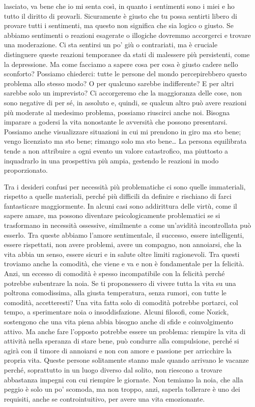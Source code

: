 \documentclass[12pt]{book} %
\begin{document}
lasciato, va bene che io mi senta così, in quanto i sentimenti sono i miei e ho tutto il diritto di provarli. Sicuramente
è giusto che tu possa sentirti libero di provare tutti i sentimenti, ma questo non significa che sia logico o giusto.
Se abbiamo sentimenti o reazioni esagerate o illogiche dovremmo accorgerci e trovare una moderazione. Ci sta sentirsi
un po' giù o contrariati, ma è cruciale distinguere queste reazioni temporanee da stati di malessere più persistenti, come la depressione. Ma come
facciamo a sapere cosa per cosa è giusto cadere nello sconforto? Possiamo chiederci: tutte le persone del mondo
percepirebbero questo problema allo stesso modo? O per qualcuno sarebbe indifferente? E per altri sarebbe solo un
imprevisto? Ci accorgeremo che la maggioranza delle cose, non sono negative di per sé, in assoluto e, quindi,
se qualcun altro può avere reazioni più moderate al medesimo problema, possiamo riuscirci anche noi. Bisogna imparare a
godersi la vita nonostante le avversità che possono presentarsi. Possiamo anche visualizzare situazioni in cui mi prendono in giro ma sto bene;
vengo licenziato ma sto bene; rimango solo ma sto bene… La persona equilibrata tende a non attribuire a ogni evento un valore catastrofico, ma piuttosto a inquadrarlo in una prospettiva più ampia, gestendo le reazioni in modo proporzionato.

Tra i desideri confusi per necessità più problematiche ci sono quelle immateriali, rispetto a quelle materiali, perché
più difficili da definire e rischiano di farci fantasticare maggiormente. In alcuni casi sono addirittura delle virtù, come il
sapere amare, ma possono diventare psicologicamente problematici se si trasformano in necessità ossessive, similmente a come un'avidità incontrollata può esserlo. Tra queste abbiamo
l'amore sentimentale, il successo, essere intelligenti, essere rispettati, non avere problemi,
avere un compagno, non annoiarsi, che la vita abbia un senso, essere sicuri e in salute oltre limiti ragionevoli. Tra
questi troviamo anche la comodità, che viene e va e non è fondamentale per la felicità. Anzi, un eccesso di comodità è spesso 
incompatibile con la felicità perché potrebbe subentrare la noia. Se ti proponessero di vivere tutta la vita su una poltrona
comodissima, alla giusta temperatura, senza rumori, con tutte le comodità, accetteresti? 
Una vita fatta solo di comodità potrebbe portarci, col tempo, a sperimentare noia o insoddisfazione. Alcuni filosofi, come Nozick, sostengono che una vita piena abbia bisogno anche di sfide e coinvolgimento attivo. Ma anche fare l'opposto potrebbe essere un problema:
riempire la vita di attività nella speranza di stare bene, può condurre alla compulsione, perché si agirà con
il timore di annoiarsi e non con amore e passione per arricchire la propria vita. Queste persone solitamente stanno
male quando arrivano le vacanze perché, soprattutto in un luogo diverso dal solito, non riescono a trovare abbastanza
impegni con cui riempire le giornate. Non temiamo la noia, che alla peggio è solo un
po' scomoda, ma non troppo, anzi, saperla tollerare è uno dei requisiti, anche se
controintuitivo, per avere una vita emozionante.
\end{document}
